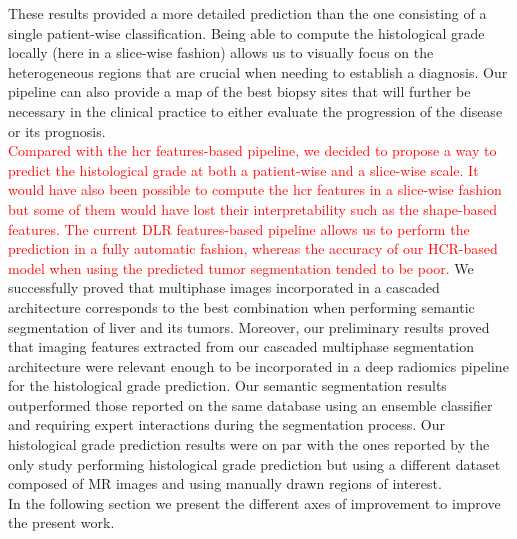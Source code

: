 These results provided a more detailed prediction than the one
consisting of a single patient-wise classification. Being able to
compute the histological grade locally (here in a slice-wise fashion)
allows us to visually focus on the heterogeneous regions that are
crucial when needing to establish a diagnosis. Our pipeline can also
provide a map of the best biopsy sites that will further be necessary in
the clinical practice to either evaluate the progression of the disease
or its prognosis.\\
\textcolor{red}
{
Compared with the \ac{hcr} features-based pipeline, we decided to propose a way to predict the histological grade at both a patient-wise and a slice-wise scale. It would have also been possible to compute the \ac{hcr} features in a slice-wise fashion but some of them would have lost their interpretability such as the shape-based features. The current DLR features-based pipeline allows us to perform the prediction in a fully automatic fashion, whereas the accuracy of our HCR-based model when using the predicted tumor segmentation tended to be poor.
}
We successfully proved that multiphase images incorporated in a cascaded architecture corresponds to the best combination when performing semantic segmentation of liver and its tumors. Moreover, our preliminary results proved that imaging features extracted from our cascaded multiphase segmentation architecture were relevant enough to be incorporated in a deep radiomics pipeline for the histological grade prediction. 
Our semantic segmentation results outperformed those reported on the same database using an ensemble classifier and requiring expert interactions during the segmentation process.
Our histological grade prediction results were on par with the ones reported by the only study performing histological grade prediction but using a different dataset composed of MR images and using manually drawn regions of interest.\\
In the following section we present the different axes of improvement to improve the present work.

